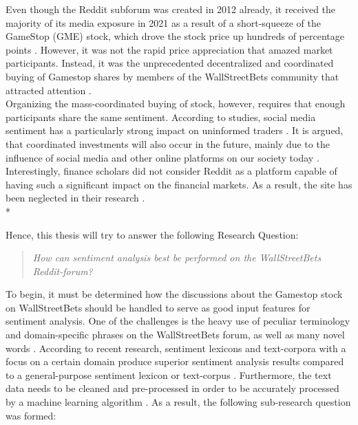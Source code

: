 \documentclass[11pt, a4paper]{article}
\begin{document}
Even though the Reddit subforum was created in 2012 already, it received the majority of its media exposure in 2021 as a result of a short-squeeze 
of the GameStop (GME) stock, which drove the stock price up hundreds of percentage points \citep{diangson2021betonreddit}. However, it was not the rapid price appreciation that 
amazed market participants. Instead, it was the unprecedented decentralized and coordinated buying of Gamestop shares by members of the WallStreetBets 
community that attracted attention \citep{anand2021WallstreetbetsAgainstWallstreet}.
\\
Organizing the mass-coordinated buying of stock, however, requires that enough participants share the same sentiment. According to studies, 
social media sentiment has a particularly strong impact on uninformed traders \citep{danbolt2015InvestorSentiment}. It is argued, that coordinated investments will also
occur in the future, mainly due to the influence of social media and other online platforms on our society today \citep{semenova2021reddits}.
\\
Interestingly, finance scholars did not consider Reddit as a platform capable of having such a significant impact on the financial markets. 
As a result, the site has been neglected in their research \citep{long2021LikeTheStock}. \\*

\noindent
Hence, this thesis will try to answer the following Research Question:
\begin{quote}
\emph{How can sentiment analysis best be performed on the WallStreetBets Reddit-forum?}
\end{quote}

To begin, it must be determined how the discussions about the Gamestop stock on WallStreetBets should be handled to serve as good input features for sentiment analysis. 
One of the challenges is the heavy use of peculiar terminology and domain-specific phrases on the WallStreetBets forum, as well as many novel words \citep{anand2021WallstreetbetsAgainstWallstreet}. 
According to recent research, sentiment lexicons and text-corpora with a focus on a certain domain produce superior sentiment analysis results compared to a 
general-purpose sentiment lexicon or text-corpus \citep{park2015EfficientExtraction}. Furthermore, the text data needs to be cleaned and pre-processed in order to be accurately 
processed by a machine learning algorithm \citep{jemai2021SentimentAnalysis}. As a result, the following sub-research question was formed:
\end{document}
